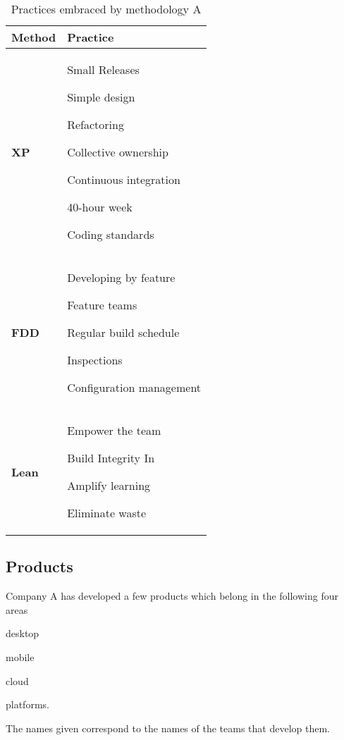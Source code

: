 \begin{table} [H]
\caption{Practices embraced by methodology A}
\begin{tabular}{| p{2cm} | p{13cm}|}
    \hline
     \textbf{Method} & \textbf{Practice} \\ \hline
     \textbf{XP}  & \begin{inparaenum} [a\upshape)]
     				\item Small Releases \item Simple design \item Refactoring \item Collective ownership \item Continuous integration \item 40-hour week \item Coding standards
					\end{inparaenum}      \\ \hline
     \textbf{FDD}  & \begin{inparaenum} [a\upshape)]  \item Developing by feature \item Feature teams \item Regular build schedule \item Inspections \item Configuration management
     				  \end{inparaenum}\\ \hline
     \textbf{Lean} & \begin{inparaenum} [a\upshape)] \item Empower the team \item Build Integrity In \item Amplify learning \item Eliminate waste
     				 \end{inparaenum} \\ \hline
\end{tabular}
\label{table:methodologyA_practices}
\end{table}

\subsection{Products}
Company A has developed a few products which belong in the following four areas 
\begin{inparaenum} [a\upshape)]
\item desktop
\item mobile
\item cloud
\item platforms.
\end{inparaenum}
The names given correspond to the names of the teams that develop them.

